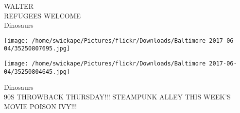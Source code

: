 \documentclass[10pt,letterpaper]{article}
\begin{document}
WALTER\\
REFUGEES WELCOME\\
Dinosaurs\\
\pagebreak

\texttt{[image: /home/swickape/Pictures/flickr/Downloads/Baltimore 2017-06-04/35250807695.jpg]}

\vspace{0.25in}
\texttt{[image: /home/swickape/Pictures/flickr/Downloads/Baltimore 2017-06-04/35250804645.jpg]}

Dinosaurs\\
90S THROWBACK THURSDAY!!! STEAMPUNK ALLEY THIS WEEK'S MOVIE POISON IVY!!!\\
\pagebreak
\end{document}
